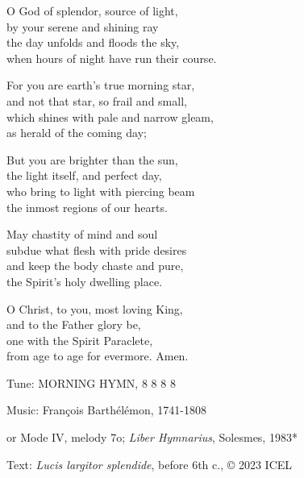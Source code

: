 \hymn

\begin{hymnverse}
O God of splendor, source of light,\\
by your serene and shining ray\\
the day unfolds and floods the sky,\\
when hours of night have run their course.

For you are earth’s true morning star,\\
and not that star, so frail and small,\\
which shines with pale and narrow gleam,\\
as herald of the coming day;

But you are brighter than the sun,\\
the light itself, and perfect day,\\
who bring to light with piercing beam\\
the inmost regions of our hearts.

May chastity of mind and soul\\
subdue what flesh with pride desires\\
and keep the body chaste and pure,\\
the Spirit’s holy dwelling place.

O Christ, to you, most loving King,\\
and to the Father glory be,\\
one with the Spirit Paraclete,\\
from age to age for evermore. Amen.
\end{hymnverse}

\begin{hymnsource}
Tune: MORNING HYMN, 8 8 8 8

Music: François Barthélémon, 1741-1808

or Mode IV, melody 7o; \emph{Liber Hymnarius}, Solesmes, 1983*

Text: \emph{Lucis largitor splendide}, before 6th c., © 2023 ICEL
\end{hymnsource}